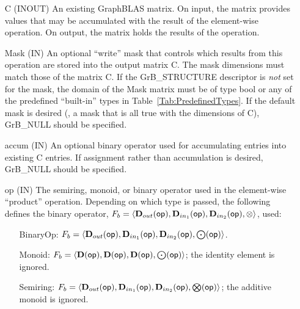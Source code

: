 \begin{itemize}[leftmargin=1.1in]
    \item[{\sf C}]    ({\sf INOUT}) An existing GraphBLAS matrix. On input,
    the matrix provides values that may be accumulated with the result of the
    element-wise operation.  On output, the matrix holds the results of the
    operation.

    \item[{\sf Mask}] ({\sf IN}) An optional ``write'' mask that controls which
    results from this operation are stored into the output matrix {\sf C}. The 
    mask dimensions must match those of the matrix {\sf C}. If the 
    {\sf GrB\_STRUCTURE} descriptor is {\em not} set for the mask, the domain of the 
    {\sf Mask} matrix must be of type {\sf bool} or any of the predefined 
    ``built-in'' types in Table~\ref{Tab:PredefinedTypes}.  If the default
    mask is desired (\ie, a mask that is all {\sf true} with the dimensions of {\sf C}), 
    {\sf GrB\_NULL} should be specified.

    \item[{\sf accum}] ({\sf IN}) An optional binary operator used for accumulating
    entries into existing {\sf C} entries.
    If assignment rather than accumulation is
    desired, {\sf GrB\_NULL} should be specified.

    \item[{\sf op}]   ({\sf IN}) The semiring, monoid, or binary operator 
    used in the element-wise ``product'' operation.  Depending on which type is
    passed, the following defines the binary operator, 
    $F_b=\langle \mbox{$\mathbf{D}_{out}$}({\sf op}),\mbox{$\mathbf{D}_{in_{1}}$}({\sf op}),\mbox{$\mathbf{D}_{in_{2}}$}({\sf op}),\otimes\rangle$, used:
    \begin{itemize}[leftmargin=1.1in]
    \item[BinaryOp:] $F_b = \langle \mbox{$\mathbf{D}_{out}$}({\sf op}), \mbox{$\mathbf{D}_{in_{1}}$}({\sf op}),
    \mbox{$\mathbf{D}_{in_{2}}$}({\sf op}),\bold{\bigodot}({\sf op})\rangle$.  
    \item[Monoid:] $F_b = \langle \bold{D}({\sf op}), \bold{D}({\sf op}),
    \bold{D}({\sf op}),\bold{\bigodot}({\sf op})\rangle$;
    the identity element is ignored. 
    \item[Semiring:] $F_b = \langle \mbox{$\mathbf{D}_{out}$}({\sf op}), \mbox{$\mathbf{D}_{in_{1}}$}({\sf op}),
    \mbox{$\mathbf{D}_{in_{2}}$}({\sf op}),\bold{\bigotimes}({\sf op})\rangle$; the
    additive monoid is ignored.
    \end{itemize}
    

\end{itemize}
